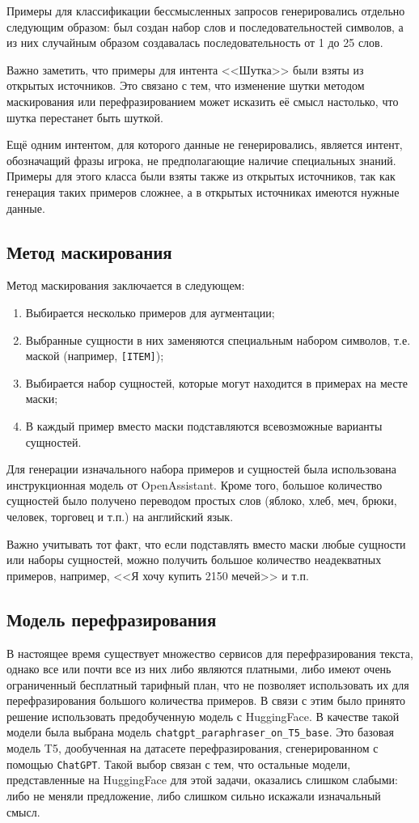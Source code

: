 Примеры для классификации бессмысленных запросов генерировались отдельно следующим образом: был создан набор слов и последовательностей 
символов, а из них случайным образом создавалась последовательность от 1 до 25 слов.

Важно заметить, что примеры для интента <<Шутка>> были взяты из открытых источников. Это связано с тем, что 
изменение шутки методом маскирования или перефразированием может исказить её смысл настолько, что шутка перестанет быть шуткой.

Ещё одним интентом, для которого данные не генерировались, является интент, обозначащий фразы игрока, 
не предполагающие наличие специальных знаний. Примеры для этого класса были взяты также из открытых источников, так как генерация таких 
примеров сложнее, а в открытых источниках имеются нужные данные.

\subsection{Метод маскирования}
Метод маскирования заключается в следующем: 
\begin{enumerate}
    \item Выбирается несколько примеров для аугментации;
    \item Выбранные сущности в них заменяются специальным набором символов, т.е. маской (например, \texttt{[ITEM]});
    \item Выбирается набор сущностей, которые могут находится в примерах на месте маски;
    \item В каждый пример вместо маски подставляются всевозможные варианты сущностей.
\end{enumerate}

Для генерации изначального набора примеров и сущностей была использована инструкционная модель от OpenAssistant. Кроме того, большое количество 
сущностей было получено переводом простых слов (яблоко, хлеб, меч, брюки, человек, торговец и т.п.) на английский язык.

Важно учитывать тот факт, что если подставлять вместо маски любые сущности или наборы сущностей, можно получить большое количество 
неадекватных примеров, например, <<Я хочу купить 2150 мечей>> и т.п. 

\subsection{Модель перефразирования}
В настоящее время существует множество сервисов для перефразирования текста, однако все или почти все из них либо являются платными, 
либо имеют  очень ограниченный бесплатный тарифный план, что не позволяет использовать их для перефразирования большого количества примеров. 
В связи с этим было принято решение использовать предобученную модель с HuggingFace. В качестве такой модели была выбрана модель 
\texttt{chatgpt\_paraphraser\_on\_T5\_base}. Это базовая модель T5, дообученная на датасете перефразирования, сгенерированном с помощью 
\texttt{ChatGPT}. Такой выбор связан с тем, что остальные модели, представленные на HuggingFace для этой задачи, оказались слишком слабыми: 
либо не меняли предложение, либо слишком сильно искажали изначальный смысл.

